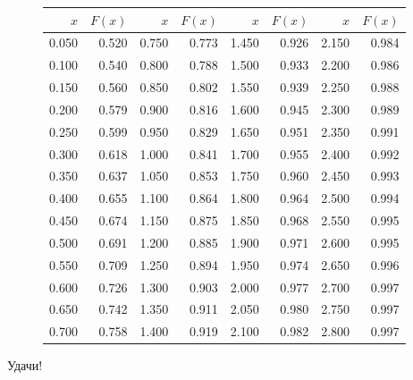 \documentclass[addpoints, answers]{exam} %
\begin{document}
\begin{figure}[b]
\begin{minipage}[b]{0.35\linewidth}
\begin{tikzpicture}
\end{tikzpicture}
\par\vspace{0pt}
  \end{minipage}%
  \begin{minipage}[b]{0.60\linewidth}
    \centering
\begin{tabular}{rr|rr|rr|rr}
  \hline
$x$ & $F(x)$ & $x$ & $F(x)$ & $x$ & $F(x)$ & $x$ & $F(x)$ \\
  \hline
0.050 & 0.520 & 0.750 & 0.773 & 1.450 & 0.926 & 2.150 & 0.984 \\
  0.100 & 0.540 & 0.800 & 0.788 & 1.500 & 0.933 & 2.200 & 0.986 \\
  0.150 & 0.560 & 0.850 & 0.802 & 1.550 & 0.939 & 2.250 & 0.988 \\
  0.200 & 0.579 & 0.900 & 0.816 & 1.600 & 0.945 & 2.300 & 0.989 \\
  0.250 & 0.599 & 0.950 & 0.829 & 1.650 & 0.951 & 2.350 & 0.991 \\
  0.300 & 0.618 & 1.000 & 0.841 & 1.700 & 0.955 & 2.400 & 0.992 \\
  0.350 & 0.637 & 1.050 & 0.853 & 1.750 & 0.960 & 2.450 & 0.993 \\
  0.400 & 0.655 & 1.100 & 0.864 & 1.800 & 0.964 & 2.500 & 0.994 \\
  0.450 & 0.674 & 1.150 & 0.875 & 1.850 & 0.968 & 2.550 & 0.995 \\
  0.500 & 0.691 & 1.200 & 0.885 & 1.900 & 0.971 & 2.600 & 0.995 \\
  0.550 & 0.709 & 1.250 & 0.894 & 1.950 & 0.974 & 2.650 & 0.996 \\
  0.600 & 0.726 & 1.300 & 0.903 & 2.000 & 0.977 & 2.700 & 0.997 \\
  0.650 & 0.742 & 1.350 & 0.911 & 2.050 & 0.980 & 2.750 & 0.997 \\
  0.700 & 0.758 & 1.400 & 0.919 & 2.100 & 0.982 & 2.800 & 0.997 \\
   \hline
\end{tabular}
\par\vspace{0pt}
\end{minipage}
\label{fig:test}
\end{figure}

\begin{flushright}
Удачи!
\end{flushright}
\end{document}
